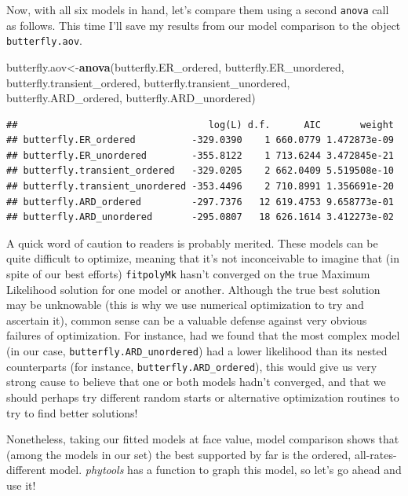 \documentclass[fleqn,10pt,lineno]{wlpeerj} %
\newenvironment{Shaded}{\begin{snugshade}}{\end{snugshade}}
\newcommand{\FunctionTok}[1]{\textcolor[rgb]{0.13,0.29,0.53}{\textbf{#1}}}
\newcommand{\NormalTok}[1]{#1}
\newcommand{\OtherTok}[1]{\textcolor[rgb]{0.56,0.35,0.01}{#1}}
\begin{document}
Now, with all six models in hand, let's compare them using a second \texttt{anova} call as follows. This time I'll save my results from our model comparison to the object \texttt{butterfly.aov}.

\begin{Shaded}
\begin{Highlighting}[]
\NormalTok{butterfly.aov}\OtherTok{\textless{}{-}}\FunctionTok{anova}\NormalTok{(butterfly.ER\_ordered,}
\NormalTok{  butterfly.ER\_unordered,}
\NormalTok{  butterfly.transient\_ordered,}
\NormalTok{  butterfly.transient\_unordered,}
\NormalTok{  butterfly.ARD\_ordered,}
\NormalTok{  butterfly.ARD\_unordered)}
\end{Highlighting}
\end{Shaded}

\begin{verbatim}
##                                  log(L) d.f.      AIC       weight
## butterfly.ER_ordered          -329.0390    1 660.0779 1.472873e-09
## butterfly.ER_unordered        -355.8122    1 713.6244 3.472845e-21
## butterfly.transient_ordered   -329.0205    2 662.0409 5.519508e-10
## butterfly.transient_unordered -353.4496    2 710.8991 1.356691e-20
## butterfly.ARD_ordered         -297.7376   12 619.4753 9.658773e-01
## butterfly.ARD_unordered       -295.0807   18 626.1614 3.412273e-02
\end{verbatim}

A quick word of caution to readers is probably merited. These models can be quite difficult to optimize, meaning that it's not inconceivable to imagine that (in spite of our best efforts) \texttt{fitpolyMk} hasn't converged on the true Maximum Likelihood solution for one model or another. Although the true best solution may be unknowable (this is why we use numerical optimization to try and ascertain it), common sense can be a valuable defense against very obvious failures of optimization. For instance, had we found that the most complex model (in our case, \texttt{butterfly.ARD\_unordered}) had a lower likelihood than its nested counterparts (for instance, \texttt{butterfly.ARD\_ordered}), this would give us very strong cause to believe that one or both models hadn't converged, and that we should perhaps try different random starts or alternative optimization routines to try to find better solutions!

Nonetheless, taking our fitted models at face value, model comparison shows that (among the models in our set) the best supported by far is the ordered, all-rates-different model. \emph{phytools} has a function to graph this model, so let's go ahead and use it!
\end{document}
